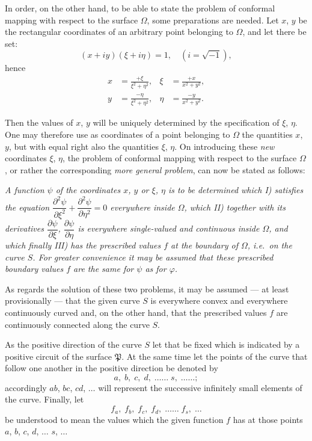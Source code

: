 \documentclass{article}
\begin{document}
In order, on the other hand, to be able to state the problem of conformal mapping with respect to the surface $\Omega$, some preparations are needed. Let $x$, $y$ be the rectangular coordinates of an arbitrary point belonging to $\Omega$, and let there be set:
\[
(x+iy)(\xi+i\eta)=1, \quad (i=\sqrt{-1}),
\]
hence
\[
\begin{aligned}
x &= \frac{+\xi}{\xi^{2}+\eta^{2}}, & \xi &= \frac{+x}{x^{2}+y^{2}},\\
y &= \frac{-\eta}{\xi^{2}+\eta^{2}}, & \eta &= \frac{-y}{x^{2}+y^{2}}.
\end{aligned}
\]

Then the values of $x$, $y$ will be uniquely determined by the specification of $\xi$, $\eta$. One may therefore use as coordinates of a point belonging to $\Omega$ the quantities $x$, $y$, but with equal right also the quantities $\xi$, $\eta$. On introducing these \emph{new} coordinates $\xi$, $\eta$, the problem of conformal mapping with respect to the surface $\Omega$, or rather the corresponding \emph{more general problem}, can now be stated as follows:

\emph{A function $\psi$ of the coordinates $x$, $y$ or $\xi$, $\eta$ is to be determined which I) satisfies the equation $\dfrac{\partial^{2}\psi}{\partial\xi^{2}}+\dfrac{\partial^{2}\psi}{\partial\eta^{2}}=0$ everywhere inside $\Omega$, which II) together with its derivatives $\dfrac{\partial\psi}{\partial\xi}$, $\dfrac{\partial\psi}{\partial\eta}$ is everywhere single-valued and continuous inside $\Omega$, and which finally III) has the prescribed values $f$ at the boundary of $\Omega$, i.e.\ on the curve $S$. For greater convenience it may be assumed that these prescribed boundary values $f$ are the same for $\psi$ as for $\varphi$.}

As regards the solution of these two problems, it may be assumed --- at least provisionally --- that the given curve $S$ is everywhere convex and everywhere continuously curved
and, on the other hand, that the prescribed values $f$ are continuously connected along the curve $S$.

As the positive direction of the curve $S$ let that be fixed which is indicated by a positive circuit of the surface $\mathfrak{P}$. At the same time let the points of the curve that follow one another in the positive direction be denoted by
\[
a,\; b,\; c,\; d,\; \ldots\ldots\; s,\; \ldots\ldots;
\]
accordingly $ab$, $bc$, $cd$, $\ldots$ will represent the successive infinitely small elements of the curve. Finally, let
\[
f_{a},\; f_{b},\; f_{c},\; f_{d},\; \ldots\ldots\; f_{s},\; \ldots
\]
be understood to mean the values which the given function $f$ has at those points $a$, $b$, $c$, $d$, $\ldots$ $s$, $\ldots$
\end{document}
